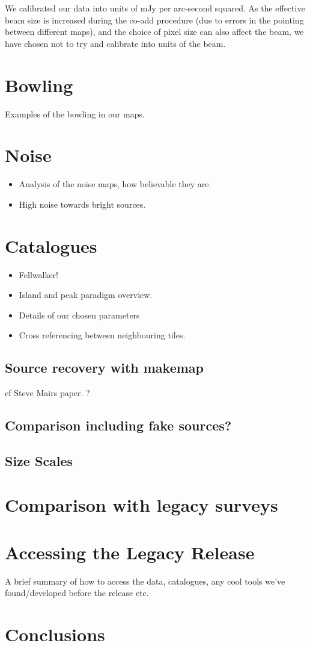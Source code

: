 \documentclass[usenatbib]{mn2e}
\begin{document}
We calibrated our data into units of mJy per arc-second squared.
As the effective beam size is increased during the co-add procedure
(due to errors in the pointing between different maps), and the choice
of pixel size can also affect the beam, we have chosen not to try and
calibrate into units of the beam.


\section{Bowling}
Examples of the bowling in our maps.

\section{Noise}
\begin{itemize}
\item Analysis of the noise maps, how believable they are.
\item High noise towards bright sources.
\end{itemize}



\section{Catalogues}
\begin{itemize}
\item Fellwalker! \citep{2015A&C....10...22B}
\item Island and peak paradigm overview.
\item Details of our chosen parameters
\item Cross referencing between neighbouring tiles.
\end{itemize}

\subsection{Source recovery with makemap}
cf Steve Mairs paper. \citep{2014ApJ...783...60M} ?

\subsection{Comparison including fake sources?}

\subsection{Size Scales}

\section{Comparison with legacy surveys}

\section{Accessing the Legacy Release}
A brief summary of how to access the data, catalogues, any cool tools
we've found/developed before the release etc.

\section{Conclusions}



\end{document}
